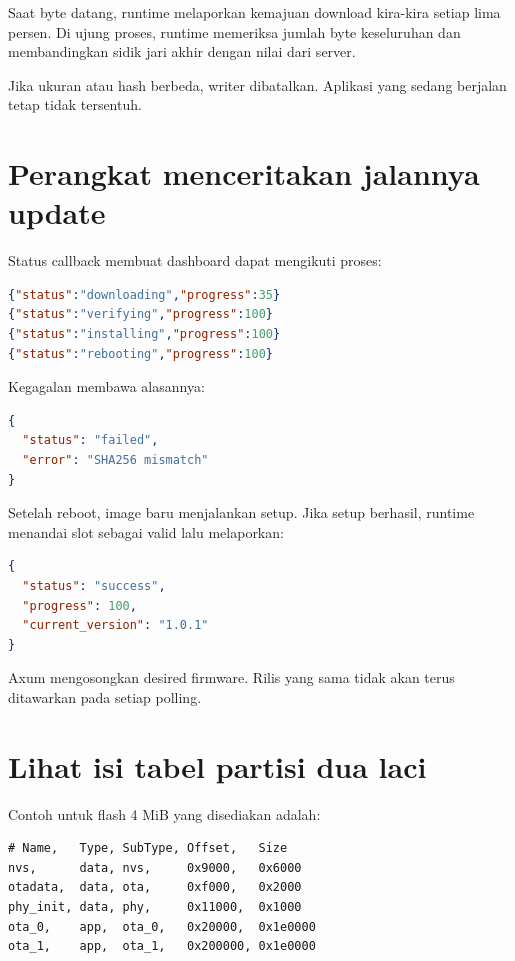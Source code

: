 Saat byte datang, runtime melaporkan kemajuan download kira-kira setiap lima persen. Di ujung proses, runtime memeriksa jumlah byte keseluruhan dan membandingkan sidik jari akhir dengan nilai dari server.

Jika ukuran atau hash berbeda, writer dibatalkan. Aplikasi yang sedang berjalan tetap tidak tersentuh.

\section{Perangkat menceritakan jalannya update}

Status callback membuat dashboard dapat mengikuti proses:

\begin{lstlisting}[language=JSON,numbers=none]
{"status":"downloading","progress":35}
{"status":"verifying","progress":100}
{"status":"installing","progress":100}
{"status":"rebooting","progress":100}
\end{lstlisting}

Kegagalan membawa alasannya:

\begin{lstlisting}[language=JSON,numbers=none]
{
  "status": "failed",
  "error": "SHA256 mismatch"
}
\end{lstlisting}

Setelah reboot, image baru menjalankan setup. Jika setup berhasil, runtime menandai slot sebagai valid lalu melaporkan:

\begin{lstlisting}[language=JSON,numbers=none]
{
  "status": "success",
  "progress": 100,
  "current_version": "1.0.1"
}
\end{lstlisting}

Axum mengosongkan desired firmware. Rilis yang sama tidak akan terus ditawarkan pada setiap polling.

\section{Lihat isi tabel partisi dua laci}

Contoh untuk flash 4 MiB yang disediakan adalah:

\begin{lstlisting}[numbers=none]
# Name,   Type, SubType, Offset,   Size
nvs,      data, nvs,     0x9000,   0x6000
otadata,  data, ota,     0xf000,   0x2000
phy_init, data, phy,     0x11000,  0x1000
ota_0,    app,  ota_0,   0x20000,  0x1e0000
ota_1,    app,  ota_1,   0x200000, 0x1e0000
\end{lstlisting}

